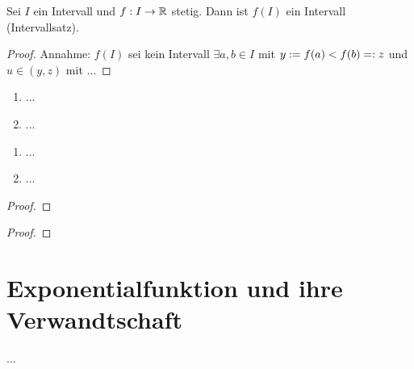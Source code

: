 \documentclass[12pt]{scrreprt}
\begin{document}
\begin{kor}\label{kor:fnkt.intervallsatz}
Sei $I$ ein Intervall und $f: I\rightarrow\mathbb{R}$ stetig. Dann ist $f(I)$ ein Intervall (Intervallsatz).
\end{kor}
\begin{proof}
Annahme: $f(I)$ sei kein Intervall \folgt $\exists a, b\in I$ mit $y:= f(a) < f(b) =: z$ und $u\in (y, z)$
mit ...
\end{proof}

\begin{bsp}\label{bsp:fnkt.nst-intsatz-bsp}
\begin{enumerate}
\item ...\label{bsp:fnkt.nst-intsatz-bsp.a}
\item ...\label{bsp:fnkt.nst-intsatz-bsp.b}
\end{enumerate}
\end{bsp}

\begin{dfn}\label{dfn:fnkt.} %

\end{dfn}

\begin{bsp*}
\begin{enumerate}
\item ...
\item ...
\end{enumerate}
\end{bsp*}

\begin{bem}\label{}

\end{bem}
\begin{proof}

\end{proof}

\begin{thm}\label{}

\end{thm}
\begin{proof}

\end{proof}

\begin{bsp}\label{}

\end{bsp}

\section{Exponentialfunktion und ihre Verwandtschaft}
\label{}
...
\end{document}
